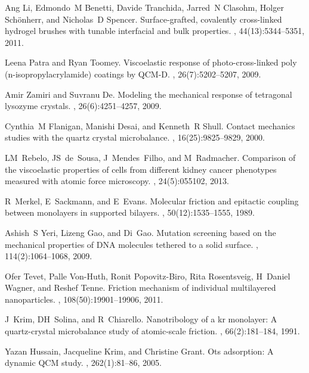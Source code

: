 \documentclass[floatfix,superscriptaddress,a4paper,twocolumn]{revtex4-1}
\begin{document}
\begin{thebibliography}{10}
Ang Li, Edmondo~M Benetti, Davide Tranchida, Jarred~N Clasohm, Holger
  Sch{\"o}nherr, and Nicholas~D Spencer.
\newblock Surface-grafted, covalently cross-linked hydrogel brushes with
  tunable interfacial and bulk properties.
, 44(13):5344--5351, 2011.

Leena Patra and Ryan Toomey.
\newblock Viscoelastic response of photo-cross-linked poly
  (n-isopropylacrylamide) coatings by {QCM-D}.
, 26(7):5202--5207, 2009.

Amir Zamiri and Suvranu De.
\newblock Modeling the mechanical response of tetragonal lysozyme crystals.
, 26(6):4251--4257, 2009.

Cynthia~M Flanigan, Manishi Desai, and Kenneth~R Shull.
\newblock Contact mechanics studies with the quartz crystal microbalance.
, 16(25):9825--9829, 2000.

LM~Rebelo, JS~de~Sousa, J~Mendes~Filho, and M~Radmacher.
\newblock Comparison of the viscoelastic properties of cells from different
  kidney cancer phenotypes measured with atomic force microscopy.
, 24(5):055102, 2013.

R~Merkel, E~Sackmann, and E~Evans.
\newblock Molecular friction and epitactic coupling between monolayers in
  supported bilayers.
, 50(12):1535--1555, 1989.

Ashish~S Yeri, Lizeng Gao, and Di~Gao.
\newblock Mutation screening based on the mechanical properties of {DNA}
  molecules tethered to a solid surface.
, 114(2):1064--1068, 2009.

Ofer Tevet, Palle Von-Huth, Ronit Popovitz-Biro, Rita Rosentsveig, H~Daniel
  Wagner, and Reshef Tenne.
\newblock Friction mechanism of individual multilayered nanoparticles.
,
  108(50):19901--19906, 2011.

J~Krim, DH~Solina, and R~Chiarello.
\newblock Nanotribology of a kr monolayer: A quartz-crystal microbalance study
  of atomic-scale friction.
, 66(2):181--184, 1991.

Yazan Hussain, Jacqueline Krim, and Christine Grant.
\newblock Ots adsorption: A dynamic {QCM} study.
, 262(1):81--86, 2005.


\end{thebibliography}
\end{document}
